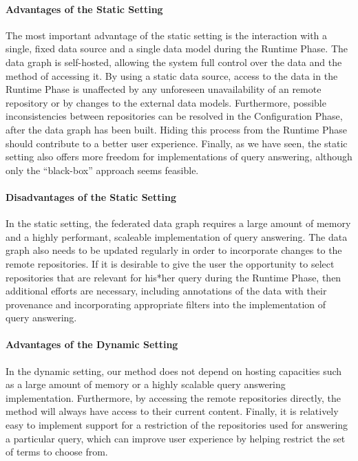 \paragraph{Advantages of the Static Setting}

The most important advantage of the static setting is the interaction with a single, fixed data source
and a single data model during the Runtime Phase.
The data graph is self-hosted, allowing the system full control over the data
and the method of accessing it.
By using a static data source, access to the data in the Runtime Phase is
unaffected by any unforeseen unavailability of an remote repository
or by changes to the external data models.
Furthermore, possible inconsistencies between repositories
can be resolved in the Configuration Phase, after the data graph has been built. Hiding this process from the Runtime Phase
should contribute to a better user experience.
Finally, as we have seen, the static setting also offers more freedom for implementations of
query answering, although only the \enquote{black-box} approach seems feasible.

\paragraph{Disadvantages of the Static Setting}

In the static setting, the federated data graph requires a large amount of memory
and a highly performant, scaleable implementation of query answering.
The data graph also needs to be updated regularly in order to incorporate changes
to the remote repositories.
If it is desirable to give the user the opportunity to select repositories 
that are relevant for his*her query during the Runtime Phase, 
then additional efforts are necessary, including annotations of the data
with their provenance and incorporating appropriate filters into the implementation
of query answering.

\paragraph{Advantages of the Dynamic Setting}

In the dynamic setting, our method does not depend on hosting capacities
such as a large amount of memory or a highly scalable query answering implementation.
Furthermore, by accessing the remote repositories directly,
the method will always have access to their current content.
Finally, it is relatively easy to implement support for 
a restriction of the repositories used for answering a particular query,
which can improve user experience by helping restrict the set of terms to choose from.

